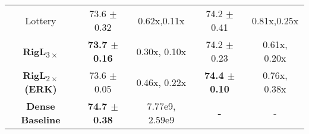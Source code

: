 {\begin{tabular}{ c cc cc }
{Lottery} &
{73.6 $\pm$ 0.32} & {0.62x,0.11x} & 
{74.2 $\pm$ 0.41} & {0.81x,0.25x} \\

\textbf{RigL\textsubscript{$3 \times$}} &
\textbf{73.7 $\pm$ 0.16} & {0.30x, 0.10x} &
{74.2 $\pm$ 0.23} & {0.61x, 0.20x} \\

\textbf{RigL\textsubscript{$2 \times$} (ERK)} &
{73.6 $\pm$ 0.05} & {0.46x, 0.22x} &
\textbf{74.4 $\pm$ 0.10} & {0.76x, 0.38x} \\

\midrule

\textbf{Dense Baseline} &
\textbf{74.7 $\pm$ 0.38} & {7.77e9, 2.59e9} &
\textbf{-} & {-} \\
\bottomrule

\end{tabular}%
}
